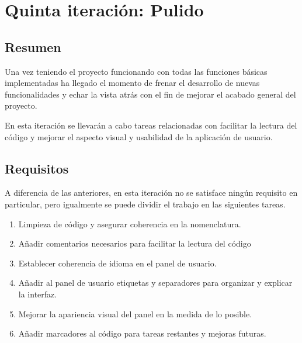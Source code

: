 
\section{Quinta iteración: Pulido}
    \subsection{Resumen}
    
        Una vez teniendo el proyecto funcionando con todas las funciones básicas implementadas ha llegado el momento de frenar el desarrollo de nuevas funcionalidades y echar la vista atrás con el fin de mejorar el acabado general del proyecto.
        
        En esta iteración se llevarán a cabo tareas relacionadas con facilitar la lectura del código y mejorar el aspecto visual y usabilidad de la aplicación de usuario.
    
    \subsection{Requisitos}
    
        A diferencia de las anteriores, en esta iteración no se satisface ningún requisito en particular, pero igualmente se puede dividir el trabajo en las siguientes tareas.
        
        \begin{enumerate}
            \item Limpieza de código y asegurar coherencia en la nomenclatura.
            \item Añadir comentarios necesarios para facilitar la lectura del código
            \item Establecer coherencia de idioma en el panel de usuario.
            \item Añadir al panel de usuario etiquetas y separadores para organizar y explicar la interfaz.
            \item Mejorar la apariencia visual del panel en la medida de lo posible.
            \item Añadir marcadores al código para tareas restantes y mejoras futuras. 
        \end{enumerate}
